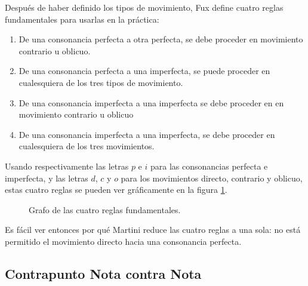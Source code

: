 \documentclass[letterpaper,12pt]{book}
\theoremstyle{definition} \newtheorem{Def}{Definición}[chapter]
\theoremstyle{definition} \newtheorem{Teo}{Teorema}[chapter]
\theoremstyle{definition} \newtheorem{Pro}{Proposición}[chapter]
\theoremstyle{definition} \newtheorem{Lema}{Lema}[chapter]
\begin{document}
Después de haber definido los tipos de movimiento, Fux define cuatro reglas fundamentales para usarlas en la práctica:

\begin{enumerate}
\item De una consonancia perfecta a otra perfecta, se debe proceder en movimiento contrario 	u oblicuo.
\item De una consonancia perfecta a una imperfecta, se puede proceder en cualesquiera de 		los tres tipos de movimiento.
\item De una consonancia imperfecta a una imperfecta se debe proceder en en movimiento 		contrario u oblicuo
\item De una consonancia imperfecta a una imperfecta, se debe proceder en cualesquiera de 	los tres movimientos.
\end{enumerate}

Usando respectivamente las letras $p$ e $i$ para las consonancias perfecta e imperfecta, y las letras $d$, $c$ y $o$ para los movimientos directo, contrario y oblicuo, estas cuatro reglas se pueden ver gráficamente en la figura \ref{Reglas}.


\begin{figure}[h]
\centering 
{}
\caption{\label{Reglas}Grafo de las cuatro reglas fundamentales.}
\end{figure}  


Es fácil ver entonces por qué Martini reduce las cuatro reglas a una sola: no está permitido el movimiento directo hacia una consonancia perfecta.

\subsection{Contrapunto Nota contra Nota}\label{CNCN}
\end{document}
